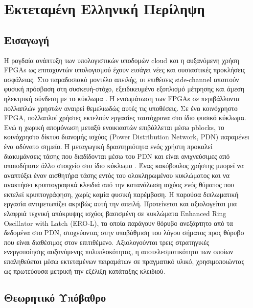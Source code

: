 \chapter*{Εκτεταμένη Ελληνική Περίληψη}

\section*{Εισαγωγή}

Η ραγδαία ανάπτυξη των υπολογιστικών υποδομών cloud και η αυξανόμενη χρήση FPGAs ως επιταχυντών υπολογισμού έχουν εισάγει νέες και ουσιαστικές προκλήσεις ασφάλειας. Στο παραδοσιακό μοντέλο απειλής, οι επιθέσεις side-channel απαιτούν φυσική πρόσβαση στη συσκευή-στόχο, εξειδικευμένο εξοπλισμό μέτρησης και άμεση ηλεκτρική σύνδεση με το κύκλωμα \cite{standaert2009introduction}. Η ενσωμάτωση των FPGAs σε περιβάλλοντα πολλαπλών χρηστών αναιρεί θεμελιωδώς αυτές τις υποθέσεις. Σε ένα κοινόχρηστο FPGA, πολλαπλοί χρήστες εκτελούν εργασίες ταυτόχρονα στο ίδιο φυσικό κύκλωμα. Ενώ η χωρική απομόνωση μεταξύ ενοικιαστών επιβάλλεται μέσω pblocks, το κοινόχρηστο δίκτυο διανομής ισχύος (Power Distribution Network, PDN) παραμένει ένα αδύνατο σημείο. Η μεταγωγική δραστηριότητα ενός χρήστη προκαλεί διακυμάνσεις τάσης που διαδίδονται μέσω του PDN και είναι ανιχνεύσιμες από οποιοδήποτε άλλο στοιχείο στο ίδιο κύκλωμα \cite{ahmed2022multi,zhao2018fpga}. Ένας κακόβουλος χρήστης μπορεί να αναπτύξει έναν αισθητήρα τάσης εντός του ολοκληρωμένου κυκλώματος και να ανακτήσει κρυπτογραφικά κλειδιά από την κατανάλωση ισχύος ενός θύματος που εκτελεί κρυπτογράφηση, χωρίς καμία φυσική παρέμβαση. Η παρούσα διπλωματική εργασία αντιμετωπίζει ακριβώς αυτή την απειλή. Προτείνεται και αξιολογείται μια ελαφριά τεχνική απόκρυψης ισχύος βασισμένη σε κυκλώματα Enhanced Ring Oscillator with Latch (ERO-L), τα οποία παράγουν θόρυβο ανεξάρτητο από τα δεδομένα στο PDN, στοχεύοντας στην υποβάθμιση του λόγου σήματος προς θόρυβο που είναι διαθέσιμος στον επιτιθέμενο. Αξιολογούνται τρεις στρατηγικές ενεργοποίησης αυξανόμενης πολυπλοκότητας, η αποτελεσματικότητα των οποίων επαληθεύεται μέσω εκτεταμένων πειραμάτων σε πραγματικό υλικό, χρησιμοποιώντας ως πρωτεύουσα μετρική την εξέλιξη κατάταξης κλειδιού.

\section*{Θεωρητικό Υπόβαθρο}

